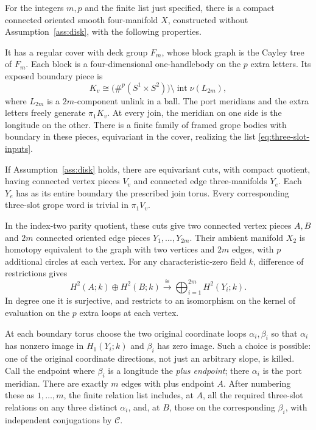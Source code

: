 \begin{proposition}
\label{prop:geometric-reduction}
For the integers \(m,p\) and the finite list just specified, there is a
compact connected oriented smooth four-manifold \(X\), constructed without
Assumption~\ref{ass:disk}, with the following properties.

It has a regular cover with deck group \(F_m\), whose block graph is the
Cayley tree of \(F_m\). Each block is a four-dimensional one-handlebody on
the \(p\) extra letters. Its exposed boundary piece is
\[
 K_v\cong
 \bigl(\#^p(S^1\times S^2)\bigr)
 \setminus\operatorname{int}\nu(L_{2m}),
\]
where \(L_{2m}\) is a \(2m\)-component unlink in a ball. The port meridians
and the extra letters freely generate \(\pi_1K_v\).
At every join, the meridian on one side is the longitude on the other.
There is a finite family of framed grope bodies with boundary in these
pieces, equivariant in the cover, realizing the list
\eqref{eq:three-slot-inputs}.

If Assumption~\ref{ass:disk} holds, there are equivariant cuts, with compact
quotient, having connected vertex pieces \(V_v\) and connected edge
three-manifolds \(Y_e\). Each \(Y_e\) has as its entire boundary the prescribed
join torus. Every corresponding three-slot grope word is trivial in
\(\pi_1V_v\).

In the index-two parity quotient, these cuts give two connected vertex
pieces \(A,B\) and \(2m\) connected oriented edge pieces \(Y_1,\ldots,Y_{2m}\).
Their ambient manifold \(X_2\) is homotopy equivalent to the graph with two
vertices and \(2m\) edges, with \(p\) additional circles at each vertex.
For any characteristic-zero field \(k\), difference of restrictions gives
\begin{equation}
\label{eq:geometry-mv-degree-two}
 H^2(A;k)\oplus H^2(B;k)
       \xrightarrow{\;\cong\;}
       \bigoplus_{i=1}^{2m}H^2(Y_i;k).
\end{equation}
In degree one it is surjective, and restricts to an isomorphism on the
kernel of evaluation on the \(p\) extra loops at each vertex.

At each boundary torus choose the two original coordinate loops
\(\alpha_i,\beta_i\) so that \(\alpha_i\) has nonzero image in
\(H_1(Y_i;k)\) and \(\beta_i\) has zero image. Such a choice is possible:
one of the original coordinate directions, not just an arbitrary slope,
is killed. Call the endpoint where \(\beta_i\) is a longitude the
\emph{plus endpoint}; there \(\alpha_i\) is the port meridian.
There are exactly \(m\) edges with plus endpoint \(A\).
After numbering these as \(1,\ldots,m\), the finite relation list includes,
at \(A\), all the required three-slot relations on any three distinct
\(\alpha_i\), and, at \(B\), those on the corresponding \(\beta_i\),
with independent conjugations by \(\mathcal C\).
\end{proposition}

